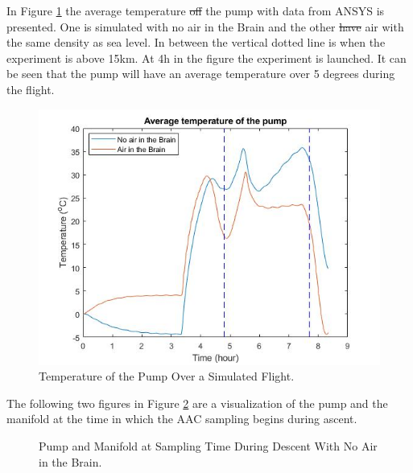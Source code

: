 \documentclass[a4paper,12pt,oneside]{article} %
\providecommand{\DIFaddtex}[1]{{\protect\color{blue}\uwave{#1}}} %
\providecommand{\DIFdeltex}[1]{{\protect\color{red}\sout{#1}}}                      %
\providecommand{\DIFaddbegin}{} %
\providecommand{\DIFaddend}{} %
\providecommand{\DIFdelbegin}{} %
\providecommand{\DIFdelend}{} %
\providecommand{\DIFadd}[1]{\texorpdfstring{\DIFaddtex{#1}}{#1}} %
\providecommand{\DIFdel}[1]{\texorpdfstring{\DIFdeltex{#1}}{}} %
\newcommand{\DIFscaledelfig}{0.5}
\newlength{\DIFdelgraphicswidth} %
\newlength{\DIFdelgraphicsheight} %
\newcommand{\DIFaddincludegraphics}[2][]{{\color{blue}\fbox{\DIFOincludegraphics[#1]{#2}}}} %
\newcommand{\DIFdelincludegraphics}[2][]{%
\sbox{\DIFdelgraphicsbox}{\DIFOincludegraphics[#1]{#2}}%
\settoboxwidth{\DIFdelgraphicswidth}{\DIFdelgraphicsbox} %
\settoboxtotalheight{\DIFdelgraphicsheight}{\DIFdelgraphicsbox} %
\scalebox{\DIFscaledelfig}{%
\parbox[b]{\DIFdelgraphicswidth}{\usebox{\DIFdelgraphicsbox}\\[-\baselineskip] \rule{\DIFdelgraphicswidth}{0em}}\llap{\resizebox{\DIFdelgraphicswidth}{\DIFdelgraphicsheight}{%
\setlength{\unitlength}{\DIFdelgraphicswidth}%
\begin{picture}(1,1)%
\thicklines\linethickness{2pt} %
{\color[rgb]{1,0,0}\put(0,0){\framebox(1,1){}}}%
{\color[rgb]{1,0,0}\put(0,0){\line( 1,1){1}}}%
{\color[rgb]{1,0,0}\put(0,1){\line(1,-1){1}}}%
\end{picture}%
}\hspace*{3pt}}} %
} %
\DeclareRobustCommand{\DIFaddbegin}{\DIFOaddbegin \let\includegraphics\DIFaddincludegraphics} %
\DeclareRobustCommand{\DIFaddend}{\DIFOaddend \let\includegraphics\DIFOincludegraphics} %
\DeclareRobustCommand{\DIFdelbegin}{\DIFOdelbegin \let\includegraphics\DIFdelincludegraphics} %
\DeclareRobustCommand{\DIFdelend}{\DIFOaddend \let\includegraphics\DIFOincludegraphics} %
\begin{document}
In Figure \ref{fig:test-flight-AAC-4-6} the average temperature \DIFdelbegin \DIFdel{off }\DIFdelend \DIFaddbegin \DIFadd{of }\DIFaddend the pump with data from ANSYS is presented. One is simulated with no air in the Brain and the other \DIFdelbegin \DIFdel{have }\DIFdelend \DIFaddbegin \DIFadd{has }\DIFaddend air with the same density as sea level. In between the vertical dotted line is when the experiment is above 15km. At 4h in the figure the experiment is launched. It can be seen that the pump will have an average temperature over 5 degrees during the flight.
\begin{figure}[H]
    \centering
    \includegraphics[width=\textwidth]{4-experiment-design/img/Thermal/pump-temperature-air-no-air.jpg}
    \caption{Temperature of the Pump Over a Simulated Flight.}
    \label{fig:test-flight-AAC-4-6}
\end{figure}

The following two figures in Figure \ref{fig:Pump-Valve-ascent-sample-4-6} are a visualization of the pump and the manifold at the time in which the AAC sampling begins during ascent. 
\begin{figure}[H]
    \centering
    \hifll
    \caption{Pump and Manifold at Sampling Time During Descent With No Air in the Brain.}
    \label{fig:Pump-Valve-ascent-sample-4-6}
\end{figure}
\end{document}
